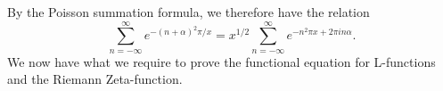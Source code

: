 By the Poisson summation formula, we therefore have the relation
\begin{equation}
\label{ModularRelation}
    \sum_{n=-\infty}^{\infty} e^{-(n + \alpha)^{2} \pi/x} = x^{1/2} \sum_{n=-\infty}^{\infty} e^{-n^{2} \pi x + 2\pi i n \alpha}.  
\end{equation}
We now have what we require to prove the functional equation for L-functions and the Riemann Zeta-function.
